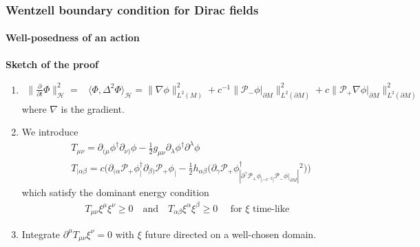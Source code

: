 \documentclass[french]{beamer}
\begin{document}
\begin{frame}[shrink=20]
\frametitle{Wentzell boundary condition for Dirac fields}
\framesubtitle{Well-posedness of an action}
\textbf{Sketch of the proof}

\begin{enumerate}
\item 
\begin{equation*}
\begin{split}
\big\| \frac{\partial }{\partial t} \Phi \big\|^2_\mathcal{H}   = &
\langle \Phi, \Delta^2 \Phi \rangle_{\mathcal{H}} = 
\|\nabla \phi \|^2_{L^2 (M)} + c^{-1} \| \mathcal{P}_- \phi\vert_{\partial M} \|^2_{L^2(\partial M)}
+ c \| \mathcal{P}_+ \nabla \phi\vert_{\partial M} \|^2_{L^2(\partial M)}
\end{split}
\end{equation*}
where $\nabla$ is the gradient.

\item We introduce 
\begin{equation*}
\begin{split}
& T_{\mu\nu} = \partial_{(\mu} \phi^\dagger \partial_{\nu)} \phi - \frac{1}{2}g_{\mu\nu} \partial_\lambda\phi^\dagger\partial^\lambda\phi  \\
& T_{|\alpha\beta} = c\Big( \partial_{(\alpha}\mathcal{P}_+\phi^\dagger_| \partial_{\beta)}\mathcal{P}_+\phi_| - 
\frac{1}{2}h_{\alpha\beta}\big( \partial_\gamma\mathcal{P}_+\phi^\dagger_| \partial^\gamma\mathcal{P}_+\phi_|
 - c^{-2}|\mathcal{P}_- \phi\vert_{\partial M}|^2 \big)\Big) 
\end{split}
\end{equation*}
which satisfy the dominant energy condition
\begin{equation*}
\begin{split}
T_{\mu\nu} \xi^\mu \xi^\nu \geq 0 \quad \mathrm{ and }\quad
T_{\alpha\beta} \xi^\alpha \xi^\beta \geq 0 
\quad\textrm{ for $\xi$ time-like}
\end{split}
\end{equation*}

\item Integrate $\partial^\mu T_{\mu\nu}\xi^\nu = 0$ with $\xi$ future directed on a well-chosen domain.

\end{enumerate}

\end{frame}
\end{document}
